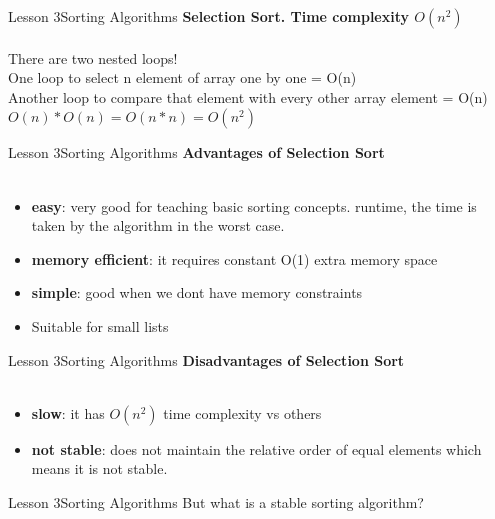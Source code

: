 \documentclass[aspectratio=1610]{beamer}
\begin{document}
\begin{frame}{Lesson 3}{Sorting Algorithms}
\LARGE
\textbf{Selection Sort. Time complexity $O(n^2)$}\\~\\
There are two nested loops!\\
One loop to select n element of array one by one = O(n)\\
Another loop to compare that element with every other array element = O(n)\\
$O(n) * O(n) = O(n*n) = O(n^2)$
\end{frame}



\begin{frame}{Lesson 3}{Sorting Algorithms}
\LARGE
\textbf{Advantages of Selection Sort}\\~\\
\Large
\begin{itemize}
	\item \textbf{easy}: very good for teaching basic sorting concepts.
 runtime, the time is taken by the algorithm in the worst case.
	\item \textbf{memory efficient}: it requires constant O(1) extra memory space
	\item \textbf{simple}: good when we dont have memory constraints
	\item Suitable for small lists
\end{itemize}

\end{frame}


\begin{frame}{Lesson 3}{Sorting Algorithms}
\LARGE
\textbf{Disadvantages of Selection Sort}\\~\\
\Large
\begin{itemize}
	\item \textbf{slow}: it has $O(n^2)$ time complexity vs others
	\item \textbf{not stable}: does not maintain the relative order of equal elements which means it is not \alert{stable}.
\end{itemize}

\end{frame}



\begin{frame}{Lesson 3}{Sorting Algorithms}
\Huge
 But what is a stable sorting algorithm?
\end{frame}
\end{document}
